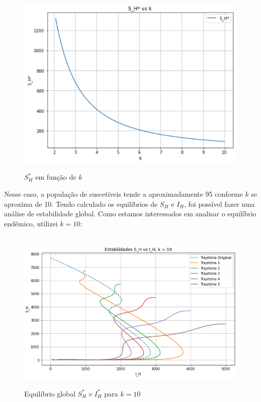 \begin{figure}[!ht]
        \centering
        \hbox{\hspace{4.2em} \includegraphics[scale=0.7] {Plot_S_H_vs_k.png}}
        \caption{$S_H^*$ em função de $k$}
\end{figure} 
\newpage
Nesse caso, a população de suscetíveis tende a aproximadamente 95 conforme 
$k$ se aproxima de 10. Tendo calculado os equilíbrios de $S_H$ e $I_H$,
foi possível fazer uma análise de estabilidade global. Como estamos interessados
em analisar o equilíbrio endêmico, utilizei $k=10$:
\begin{figure}[!ht]
        \centering
        \hbox{\hspace{2.2em} \includegraphics[scale=0.7] {Equilibrio_SH_IH_k_10.png}}
        \caption{Equilíbrio global $S_H^* \times I_H^*$ para $k=10$}
\end{figure}
